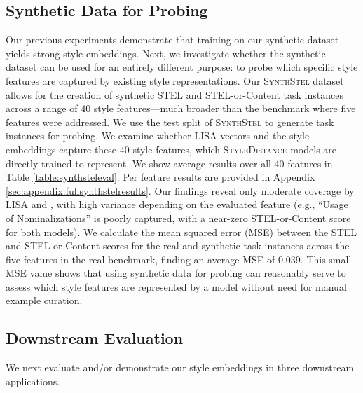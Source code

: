 \subsection{Synthetic Data for Probing}

Our previous experiments demonstrate that training on our synthetic dataset yields strong style embeddings. Next, we investigate whether the synthetic dataset can be used for an entirely different purpose: to probe which specific style features are captured by existing style representations. Our  \textsc{SynthStel} dataset allows for the creation of synthetic STEL and STEL-or-Content task instances across a  range of 40 style features---much broader than the \citet{stel} benchmark where five features were addressed. We use the test split of \textsc{SynthStel} to generate task instances for probing. We examine whether LISA vectors and the \citet{styleemb} style embeddings capture these 40 style features, which \textsc{StyleDistance} models are directly trained to represent. We show average results over all 40 features in Table \ref{table:synthsteleval}. Per feature results are provided in Appendix \ref{sec:appendix:fullsynthstelresults}. Our findings reveal only moderate coverage by LISA and \citet{styleemb}, with high variance depending on the evaluated feature (e.g., ``Usage of Nominalizations'' is poorly captured, with a near-zero STEL-or-Content score for both models). We calculate the mean squared error (MSE) between the STEL and STEL-or-Content scores for the real and synthetic task instances across the five features in the real benchmark, finding an average MSE of 0.039. This small MSE value shows that using synthetic data for probing can reasonably serve to assess which style features are represented by a model without need for manual example curation.

\synthstelevaltable

\subsection{Downstream Evaluation}

We next evaluate and/or demonstrate our style embeddings in three downstream applications.


